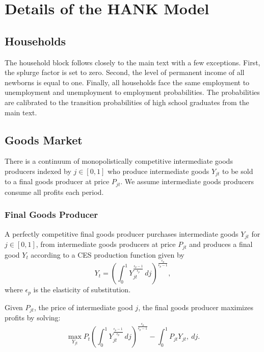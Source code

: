 \documentclass[\econtexRoot/HAFiscal]{subfiles}
\begin{document}
	
\FloatBarrier
\hypertarget{hank_appendix}{}\par\section{Details of the HANK Model}
\notinsubfile{\label{sec:hank_appendix}}


\subsection{Households}

The household block follows closely to the main text with a few exceptions. First, the splurge factor is set to zero. Second, the level of permanent income of all newborns is equal to one. Finally, all households face the same employment to unemployment and unemployment to employment probabilities. The probabilities are calibrated to the transition probabilities of high school graduates from the main text.


\subsection{Goods Market}

There is a continuum of  monopolistically competitive intermediate goods producers indexed by $j \in [0,1]$ who produce intermediate goods $Y_{jt}$ to be sold to a final goods producer at price $P_{jt}$. We assume intermediate goods producers consume all profits each period.  

\subsubsection{Final Goods Producer}

A perfectly competitive final goods producer purchases intermediate goods $Y_{jt}$ for $j \in [0,1]$, from intermediate goods producers at price $P_{jt}$ and produces a final good $Y_{t}$ according to a CES production function given by 
$$ Y_{t} = \left(\int_{0}^{1} Y_{jt}^{\frac{\epsilon_{p}-1}{\epsilon_{p}}}\, dj\right)^{\frac{\epsilon_{p}}{\epsilon_{p}-1}},$$ 
where $\epsilon_{p}$ is the elasticity of substitution.

Given $P_{jt}$, the price of intermediate good $j$, the final goods producer maximizes profits by solving:
$$ \max_{Y_{jt}} P_{t} \left(\int_{0}^{1} Y_{jt}^{\frac{\epsilon_{p}-1}{\epsilon_{p}}}\, dj\right)^{\frac{\epsilon_{p}}{\epsilon_{p}-1}} - \int_{0}^{1} P_{jt} Y_{jt} ,\ dj.$$ 
\end{document}

